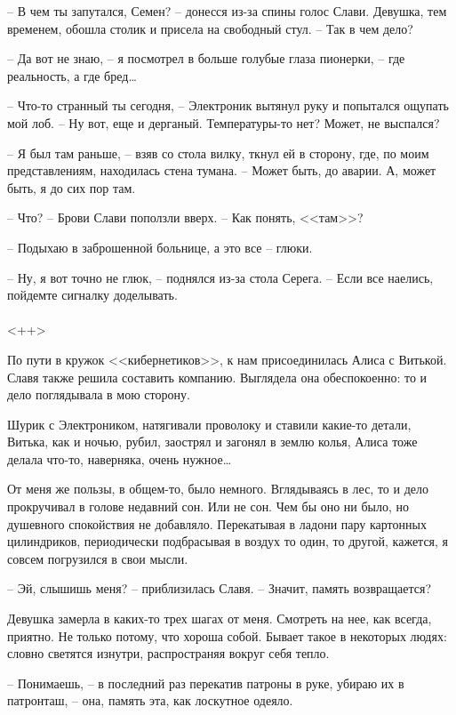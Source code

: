 \documentclass[a4paper]{book}
\begin{document}
-- В чем ты запутался, Семен? -- донесся из-за спины голос Слави. Девушка, тем временем, обошла столик и присела на свободный стул. -- Так в чем дело?

-- Да вот не знаю, -- я посмотрел в больше голубые глаза пионерки, -- где реальность, а где бред\ldots

-- Что-то странный ты сегодня, -- Электроник вытянул руку и попытался ощупать мой лоб. -- Ну вот, еще и дерганый. Температуры-то нет? Может, не выспался?

-- Я был там раньше, -- взяв со стола вилку, ткнул ей в сторону, где, по моим представлениям, находилась стена тумана. -- Может быть, до аварии. А, может быть, я до сих пор там.

-- Что? -- Брови Слави поползли вверх. -- Как понять, <<там>>?

-- Подыхаю в заброшенной больнице, а это все -- глюки.

-- Ну, я вот точно не глюк, -- поднялся из-за стола Серега. -- Если все наелись, пойдемте сигналку доделывать.

\paragraph{}<++>

По пути в кружок <<кибернетиков>>, к нам присоединилась Алиса с Витькой. Славя также решила составить компанию. Выглядела она обеспокоенно: то и дело поглядывала в мою сторону.

Шурик с Электроником, натягивали проволоку и ставили какие-то детали, Витька, как и ночью, рубил, заострял и загонял в землю колья, Алиса тоже делала что-то, наверняка, очень нужное\ldots

От меня же пользы, в общем-то, было немного. Вглядываясь в лес, то и дело прокручивал в голове недавний сон. Или не сон. Чем бы оно ни было, но душевного спокойствия не добавляло. Перекатывая в ладони пару картонных цилиндриков, периодически подбрасывая в воздух то один, то другой, кажется, я совсем погрузился в свои мысли.

-- Эй, слышишь меня? -- приблизилась Славя. -- Значит, память возвращается?

Девушка замерла в каких-то трех шагах от меня. Смотреть на нее, как всегда, приятно. Не только потому, что хороша собой. Бывает такое в некоторых людях: словно светятся изнутри, распространяя вокруг себя тепло. 

-- Понимаешь, -- в последний раз перекатив патроны в руке, убираю их в патронташ, -- она, память эта, как лоскутное одеяло.  
\end{document}
